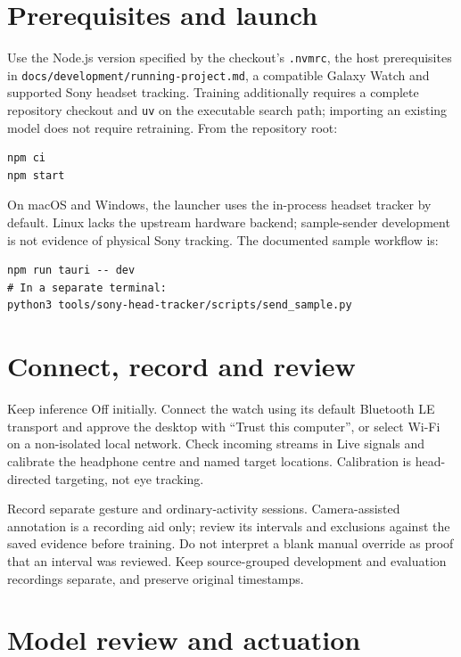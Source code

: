 \section{Prerequisites and launch}

Use the Node.js version specified by the checkout's \nolinkurl{.nvmrc}, the host prerequisites in \nolinkurl{docs/development/running-project.md}, a compatible Galaxy Watch and supported Sony headset tracking. Training additionally requires a complete repository checkout and \nolinkurl{uv} on the executable search path; importing an existing model does not require retraining. From the repository root:

\begin{verbatim}
npm ci
npm start
\end{verbatim}

On macOS and Windows, the launcher uses the in-process headset tracker by default. Linux lacks the upstream hardware backend; sample-sender development is not evidence of physical Sony tracking. The documented sample workflow is:

\begin{verbatim}
npm run tauri -- dev
# In a separate terminal:
python3 tools/sony-head-tracker/scripts/send_sample.py
\end{verbatim}

\section{Connect, record and review}

Keep inference Off initially. Connect the watch using its default Bluetooth LE transport and approve the desktop with ``Trust this computer'', or select Wi-Fi on a non-isolated local network. Check incoming streams in Live signals and calibrate the headphone centre and named target locations. Calibration is head-directed targeting, not eye tracking.

Record separate gesture and ordinary-activity sessions. Camera-assisted annotation is a recording aid only; review its intervals and exclusions against the saved evidence before training. Do not interpret a blank manual override as proof that an interval was reviewed. Keep source-grouped development and evaluation recordings separate, and preserve original timestamps.

\section{Model review and actuation}

